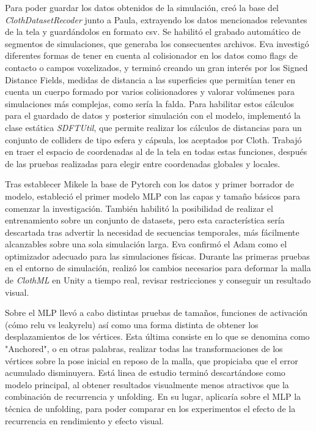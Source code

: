 Para poder guardar los datos obtenidos de la simulación, creó la base del \textit{ClothDatasetRecoder} junto a Paula, extrayendo los datos mencionados relevantes de la tela y guardándolos en formato csv. Se habilitó el grabado automático de segmentos de simulaciones, que generaba los consecuentes archivos. Eva investigó diferentes formas de tener en cuenta al colisionador en los datos como flags de contacto o campos voxelizados, y terminó creando un gran interés por los Signed Distance Fields, medidas de distancia a las superficies que permitían tener en cuenta un cuerpo formado por varios colisionadores y valorar volúmenes para simulaciones más complejas, como sería la falda. Para habilitar estos cálculos para el guardado de datos y posterior simulación con el modelo, implementó la clase estática \textit{SDFTUtil}, que permite realizar los cálculos de distancias para un conjunto de colliders de tipo esfera y cápsula, los aceptados por Cloth. Trabajó en traer el espacio de coordenadas al de la tela en todas estas funciones, después de las pruebas realizadas para elegir entre coordenadas globales y locales.\newline

Tras establecer Mikele la base de Pytorch con los datos y primer borrador de modelo, estableció el primer modelo MLP con las capas y tamaño básicos para comenzar la investigación. También habilitó la posibilidad de realizar el entrenamiento sobre un conjunto de datasets, pero esta característica sería descartada tras advertir la necesidad de secuencias temporales, más fácilmente alcanzables sobre una sola simulación larga. Eva confirmó el Adam como el optimizador adecuado para las simulaciones físicas.  Durante las primeras pruebas en el entorno de simulación, realizó los cambios necesarios para deformar la malla de \textit{ClothML} en Unity a tiempo real, revisar restricciones y conseguir un resultado visual. \newline

Sobre el MLP llevó a cabo distintas pruebas de tamaños, funciones de activación (cómo relu vs leakyrelu) así como una forma distinta de obtener los desplazamientos de los vértices. Esta última consiste en lo que se denomina como "Anchored", o en otras palabras, realizar todas las transformaciones de los vértices sobre la pose inicial en reposo de la malla, que propiciaba que el error acumulado disminuyera. Está linea de estudio terminó descartándose como modelo principal, al obtener resultados visualmente menos atractivos que la combinación de recurrencia y unfolding. En su lugar, aplicaría sobre el MLP la técnica de unfolding, para poder comparar en los experimentos el efecto de la recurrencia en rendimiento y efecto visual. \newline

